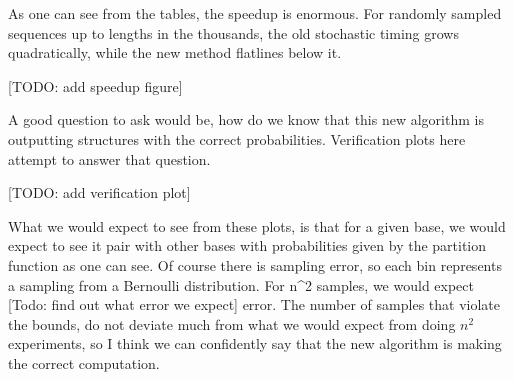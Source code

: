 As one can see from the tables, the speedup is enormous. For randomly
sampled sequences up to lengths in the thousands, the old stochastic
timing grows quadratically, while the new method flatlines below it.

[TODO: add speedup figure]

A good question to ask would be, how do we know that this new
algorithm is outputting structures with the correct
probabilities. Verification plots here attempt to answer that
question.

[TODO: add verification plot]

What we would expect to see from these plots, is that for a given
base, we would expect to see it pair with other bases with
probabilities given by the partition function as one can see. Of
course there is sampling error, so each bin represents a sampling from
a Bernoulli distribution. For n^2 samples, we would expect [Todo: find
out what error we expect] error. The number of samples that violate
the bounds, do not deviate much from what we would expect from doing
$n^2$ experiments, so I think we can confidently say that the new
algorithm is making the correct computation.
